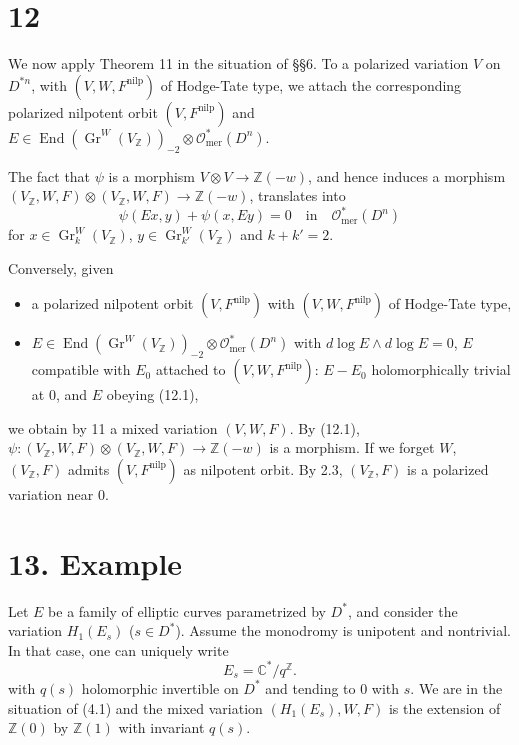 \documentclass[11pt,a4paper]{article}
\theoremstyle{plain}
\theoremstyle{definition}
\DeclareMathOperator{\End}{End}
\DeclareMathOperator{\Gr}{Gr}
\begin{document}
\section{12}

We now apply Theorem 11 in the situation of \S\S 6. To a polarized variation $V$ on $D^{*n}$, with $(V, W, F^{\text{nilp}})$ of Hodge-Tate type, we attach the corresponding polarized nilpotent orbit $(V, F^{\text{nilp}})$ and $E \in \End(\Gr^{W}(V_{\mathbb{Z}}))_{-2} \otimes \mathcal{O}_{\text{mer}}^{*}(D^{n})$.

The fact that $\psi$ is a morphism $V \otimes V \to \mathbb{Z}(-w)$, and hence induces a morphism $(V_{\mathbb{Z}}, W, F) \otimes (V_{\mathbb{Z}}, W, F) \to \mathbb{Z}(-w)$, translates into
\begin{equation}
\psi(Ex, y) + \psi(x, Ey) = 0 \quad \text{in} \quad \mathcal{O}_{\text{mer}}^{*}(D^{n}) \tag{12.1}
\end{equation}
for $x \in \Gr_{k}^{W}(V_{\mathbb{Z}})$, $y \in \Gr_{k'}^{W}(V_{\mathbb{Z}})$ and $k + k' = 2$.

Conversely, given
\begin{itemize}
\item[(a)] a polarized nilpotent orbit $(V, F^{\text{nilp}})$ with $(V, W, F^{\text{nilp}})$ of Hodge-Tate type,
\item[(b)] $E \in \End(\Gr^{W}(V_{\mathbb{Z}}))_{-2} \otimes \mathcal{O}_{\text{mer}}^{*}(D^{n})$ with $d\log E \wedge d\log E = 0$, $E$ compatible with $E_{0}$ attached to $(V, W, F^{\text{nilp}})$: $E - E_{0}$ holomorphically trivial at 0, and $E$ obeying (12.1),
\end{itemize}
we obtain by 11 a mixed variation $(V, W, F)$. By (12.1), $\psi: (V_{\mathbb{Z}}, W, F) \otimes (V_{\mathbb{Z}}, W, F) \to \mathbb{Z}(-w)$ is a morphism. If we forget $W$, $(V_{\mathbb{Z}}, F)$ admits $(V, F^{\text{nilp}})$ as nilpotent orbit. By 2.3, $(V_{\mathbb{Z}}, F)$ is a polarized variation near 0.

\section{13. Example}

Let $E$ be a family of elliptic curves parametrized by $D^{*}$, and consider the variation $H_{1}(E_{s})$ ($s \in D^{*}$). Assume the monodromy is unipotent and nontrivial. In that case, one can uniquely write
\[
E_{s} = \mathbb{C}^{*}/q^{\mathbb{Z}}.
\]
with $q(s)$ holomorphic invertible on $D^{*}$ and tending to 0 with $s$. We are in the situation of (4.1) and the mixed variation $(H_{1}(E_{s}), W, F)$ is the extension of $\mathbb{Z}(0)$ by $\mathbb{Z}(1)$ with invariant $q(s)$.
\end{document}
